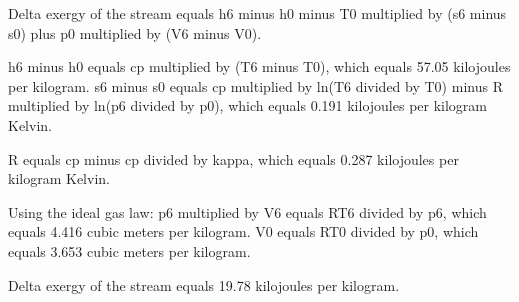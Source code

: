 Delta exergy of the stream equals h6 minus h0 minus T0 multiplied by (s6 minus s0) plus p0 multiplied by (V6 minus V0).  

h6 minus h0 equals cp multiplied by (T6 minus T0), which equals 57.05 kilojoules per kilogram.  
s6 minus s0 equals cp multiplied by ln(T6 divided by T0) minus R multiplied by ln(p6 divided by p0), which equals 0.191 kilojoules per kilogram Kelvin.  

R equals cp minus cp divided by kappa, which equals 0.287 kilojoules per kilogram Kelvin.  

Using the ideal gas law:  
p6 multiplied by V6 equals RT6 divided by p6, which equals 4.416 cubic meters per kilogram.  
V0 equals RT0 divided by p0, which equals 3.653 cubic meters per kilogram.  

Delta exergy of the stream equals 19.78 kilojoules per kilogram.
